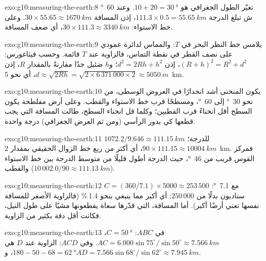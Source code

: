 \begin{solution}{exo:g10:measuring-the-earth:8}
تغيّر الطول الجغرافي هو $10 + 20 = \qty{30}{\degree}$. وعند
\qty{60}{\degree} ش تبلغ الدرجة $111.3 \times 0.5 = \qty{55.65}{km}$، إذن
المسافة $30 \times 55.65 \approx \qty{1670}{km}$. وعلى خط الاستواء:
$30 \times 111.3 \approx \qty{3340}{km}$، أي ضعف المسافة.
\end{solution}

\begin{solution}{exo:g10:measuring-the-earth:9}
يلامس خط النظر البحر في $T$: والمماس لدائرة عمودي على نصف القطر في نقطة
التماس، فالزاوية عند $T$ قائمة. وحسب فيثاغورس: $(R+h)^2 = R^2 + d^2$، إذن $d^2 = 2Rh + h^2$؛ و$h$
ضئيل جدًا مقارنةً بالمقدار $R$، إذن $d \approx \sqrt{2Rh} = \sqrt{2 \times
6\,371\,000 \times 2} \approx \qty{5050}{m}$، أي نحو \qty{5}{km}.
\end{solution}

\begin{solution}{exo:g10:measuring-the-earth:10}
يكون المنحنى أشد انحدارًا في العروض الوسطى، من نحو \qty{30}{\degree} إلى
\qty{60}{\degree}، ومسطحًا قرب خط الاستواء والقطب. وعلى أرض مفلطحة يكون السطح
أقل انحناءً قرب القطبين؛ وكلما قل انحناء السطح، طالت المسافة التي يجب قطعها كي
يدور الرأسي (ومن ثم العرض الجغرافي) درجة
واحدة.
\end{solution}

\begin{solution}{exo:g10:measuring-the-earth:11}
$1072.2/9.646 \approx \qty{111.15}{km}$ للدرجة؛ $90 \times 111.15
\approx \qty{10004}{km}$، أي أكثر من ربع خط الزوال الحقيقي بمقدار \qty{2}{km}.
فمركز القوس قريب من \qty{46}{\degree}، حيث الدرجة أطول قليلًا من متوسط الدرجة
بين خط الاستواء والقطب
($10\,002.0/90 \approx \qty{111.13}{km}$).
\end{solution}

\begin{solution}{exo:g10:measuring-the-earth:12}
مع \qty{7.1}{\degree}: $C = (360/7.1) \times 5000 \approx 253\,500$ ستاديون
بدلًا من $250\,000$: أي أكبر مما ينبغي بنحو 1.4\,\% (فالزاوية الأصغر للمسافة
نفسها تعني أرضًا أكبر). أما المسافة، التي قدّرها سعاة يقطعونها مشيًا على طول
النيل، فكانت أقل دقة بكثير من الزاوية.
\end{solution}

\begin{solution}{exo:g10:measuring-the-earth:13}
في $ABC$: $C = \qty{50}{\degree}$، $AC = 6.000 \sin 75^\circ/\sin 50^\circ
\approx \qty{7.566}{km}$. وفي $ACD$: الزاوية عند $D$ هي $180 - 50 - 68 =
\qty{62}{\degree}$، و$AD = 7.566 \sin 68^\circ/\sin 62^\circ \approx
\qty{7.945}{km}$.
\end{solution}

